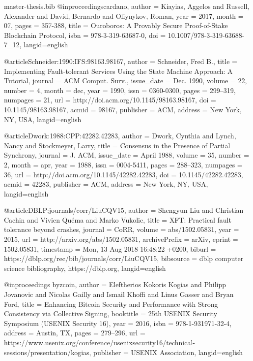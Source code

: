 \begin{filecontents}{master-thesis.bib}
@inproceedings{cardano,
author = {Kiayias, Aggelos and Russell, Alexander and David, Bernardo and Oliynykov, Roman},
year = {2017},
month = {07},
pages = {357-388},
title = {Ouroboros: A Provably Secure Proof-of-Stake Blockchain Protocol},
isbn = {978-3-319-63687-0},
doi = {10.1007/978-3-319-63688-7_12},
 langid={english}
}

@article{Schneider:1990:IFS:98163.98167,
 author = {Schneider, Fred B.},
 title = {Implementing Fault-tolerant Services Using the State Machine Approach: A Tutorial},
 journal = {ACM Comput. Surv.},
 issue_date = {Dec. 1990},
 volume = {22},
 number = {4},
 month = dec,
 year = {1990},
 issn = {0360-0300},
 pages = {299--319},
 numpages = {21},
 url = {http://doi.acm.org/10.1145/98163.98167},
 doi = {10.1145/98163.98167},
 acmid = {98167},
 publisher = {ACM},
 address = {New York, NY, USA},
  langid={english}
} 

@article{Dwork:1988:CPP:42282.42283,
 author = {Dwork, Cynthia and Lynch, Nancy and Stockmeyer, Larry},
 title = {Consensus in the Presence of Partial Synchrony},
 journal = {J. ACM},
 issue_date = {April 1988},
 volume = {35},
 number = {2},
 month = apr,
 year = {1988},
 issn = {0004-5411},
 pages = {288--323},
 numpages = {36},
 url = {http://doi.acm.org/10.1145/42282.42283},
 doi = {10.1145/42282.42283},
 acmid = {42283},
 publisher = {ACM},
 address = {New York, NY, USA},
  langid={english}
} 

@article{DBLP:journals/corr/LiuCQV15,
  author    = {Shengyun Liu and
               Christian Cachin and
               Vivien Qu{\'{e}}ma and
               Marko Vukolic},
  title     = {{XFT:} Practical fault tolerance beyond crashes},
  journal   = {CoRR},
  volume    = {abs/1502.05831},
  year      = {2015},
  url       = {http://arxiv.org/abs/1502.05831},
  archivePrefix = {arXiv},
  eprint    = {1502.05831},
  timestamp = {Mon, 13 Aug 2018 16:48:22 +0200},
  biburl    = {https://dblp.org/rec/bib/journals/corr/LiuCQV15},
  bibsource = {dblp computer science bibliography, https://dblp.org},
  langid={english}
}

@inproceedings {byzcoin,
author = {Eleftherios Kokoris Kogias and Philipp Jovanovic and Nicolas Gailly and Ismail Khoffi and Linus Gasser and Bryan Ford},
title = {Enhancing Bitcoin Security and Performance with Strong Consistency via Collective Signing},
booktitle = {25th {USENIX} Security Symposium ({USENIX} Security 16)},
year = {2016},
isbn = {978-1-931971-32-4},
address = {Austin, TX},
pages = {279--296},
url = {https://www.usenix.org/conference/usenixsecurity16/technical-sessions/presentation/kogias},
publisher = {{USENIX} Association},
langid={english}
}


\end{filecontents}
